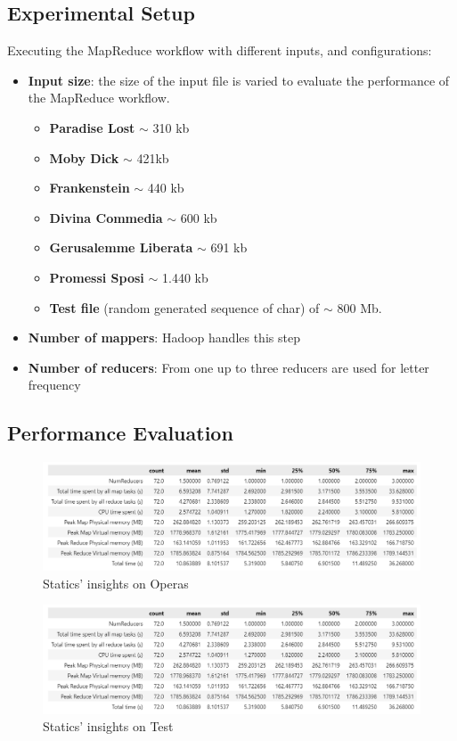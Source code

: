 \documentclass[a4paper, 12pt]{article}
\begin{document}
\subsection{Experimental Setup}
Executing the MapReduce workflow with different inputs, and configurations:
\begin{itemize}
  \item \textbf{Input size}: the size of the input file is varied to evaluate the performance of the MapReduce workflow.
        \begin{itemize}
          \item \textbf{Paradise Lost} $\sim$ 310 kb
          \item \textbf{Moby Dick} $\sim$ 421kb
          \item \textbf{Frankenstein} $\sim$ 440 kb
          \item \textbf{Divina Commedia} $\sim$ 600 kb
          \item \textbf{Gerusalemme Liberata} $\sim$ 691 kb
          \item \textbf{Promessi Sposi} $\sim$ 1.440 kb
          \item \textbf{Test file} (random generated sequence of char) of $\sim$ 800 Mb.
        \end{itemize}
  \item \textbf{Number of mappers}: Hadoop handles this step
  \item \textbf{Number of reducers}: From one up to three reducers are used for letter frequency
\end{itemize}

\subsection{Performance Evaluation}


\begin{figure}[H]
  \centering
  \includegraphics[width=\textwidth]{media/performance/opera_df_describe.png}
  \caption{Statics' insights on Operas}
  \label{fig:OperaInsights}
\end{figure}

\begin{figure}[H]
  \centering
  \includegraphics[width=\textwidth]{media/performance/opera_df_describe.png}
  \caption{Statics' insights on Test}
  \label{fig:OperaInsightsTEST}
\end{figure}
\end{document}
